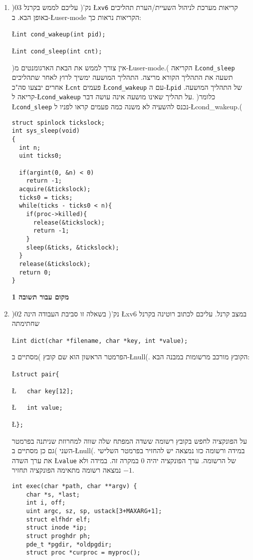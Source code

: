 \documentclass[12pt]{article}
\begin{document}
\sethebrew
\newpage
\begin{enumerate}
\item
)03 נק'(
עליכם לממש בקרנל
\L{\tt xv6}
 קריאות מערכת לניהול השעיית/הערת תהליכים באופן הבא. ב-\L{user-mode}
 הקריאות נראות כך:

\hfill\L{\lstinline$int cond_wakeup(int pid);$}
\par\noindent
\hfill\L{\lstinline$int cond_sleep(int cnt);$}

)אין צורך לממש את הבאת הארגומנטים מ-\L{user-mode}.(
 הקריאה 
\L{\tt cond\_sleep}
תשעה את התהליך הקורא מריצה.
התהליך המושעה ימשיך לרוץ לאחר שתהליכים אחרים יבצעו סה"כ
\L{\tt cnt}
פעמים
\L{\tt cond\_wakeup}
עם ה-\L{\tt pid}
של התהליך המושעה.
 קריאה ל-\L{\tt cond\_wakeup}
 על תהליך שאינו מושעה אינה עושה דבר.
 )כלומר
\L{\tt cond\_sleep}
 נכנס להשעיה לא משנה כמה פעמים קראו לפניו ל-\L{cond\_wakeup}.(
\unsethebrew
\begin{lstlisting}
struct spinlock tickslock;
int sys_sleep(void)
{
  int n;
  uint ticks0;
  
  if(argint(0, &n) < 0)
    return -1;
  acquire(&tickslock);
  ticks0 = ticks;
  while(ticks - ticks0 < n){
    if(proc->killed){
      release(&tickslock);
      return -1;
    }
    sleep(&ticks, &tickslock);
  }
  release(&tickslock);
  return 0;
}
\end{lstlisting}
\sethebrew
\newpage
\begin{center}
{\bf\large
מקום עבור תשובה 1
}
\end{center}
\newpage
\item
)02 נק'(
בשאלה זו סביבת העבודה הינה 
\L{xv6}
במצב קרנל.
עליכם לכתוב רוטינה בקרנל שחתימתה

\hfill\L{\lstinline$int dict(char *filename, char *key, int *value);$}

הפרמטר הראשון הוא שם קובץ )מסתיים ב-\L{null}(.
הקובץ מורכב מרשומות במבנה הבא:

\hfill\L{\lstinline$struct pair{$}

\hfill\L{\lstinline$   char key[12];$}

\hfill\L{\lstinline$   int value;$}

\hfill\L{\lstinline$};$}

על הפונקציה לחפש בקובץ רשומה ששדה המפתח שלה שווה למחרוזת שניתנה בפרמטר השני
)גם כן מסתיים ב-\L{null}(.
במידה ורשומה כזו נמצאה יש להחזיר בפרמטר השלישי את ערך השדה
\L{\lstinline$value$}
של הרשומה.
ערך הפונקציה יהיה 0 במקרה זה.
במידה ולא נמצאה רשומה מתאימה הפונקציה תחזיר $-1$.
\unsethebrew
\begin{lstlisting}[tabsize=3,mathescape]
int exec(char *path, char **argv) {
	char *s, *last;
	int i, off;
	uint argc, sz, sp, ustack[3+MAXARG+1];
	struct elfhdr elf;
	struct inode *ip;
	struct proghdr ph;
	pde_t *pgdir, *oldpgdir;
	struct proc *curproc = myproc();


\end{lstlisting}
\end{enumerate}
\end{document}
